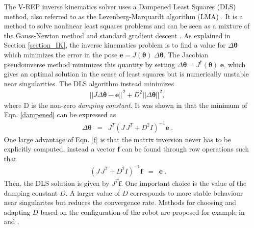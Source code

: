 The V-REP inverse kinematics solver uses a Dampened Least Squares (DLS) method, also referred to as the Levenberg-Marquardt algorithm (LMA) \cite{levenberg, marquardt}. It is a method to solve nonlinear least squares problems and can be seen as a mixture of the Gauss-Newton method and standard gradient descent \cite{bjorck}. As explained in  Section \ref{section_IK}, the inverse kinematics problem is to find a value for $\Delta\bm{\theta}$ which minimizes the error in the pose  $\bm{e}=J(\bm{\theta}) \; \Delta\bm{\theta}$. The Jacobian pseudoinverse method minimizes this quantity by setting $\Delta\bm{\theta}=J^{\dagger}(\bm{\theta}) \; \bm{e}$, which gives an optimal solution in the sense of least squares but is numerically unstable near singularities. The DLS algorithm instead minimizes 
\begin{eqnarray}\label{dampened}
	||J\Delta\bm{\theta}-\bm{e}||^2 + D^2||\Delta\bm{\theta}||^2,
\end{eqnarray} 
where D is the non-zero \textit{damping constant}.
It was shown in \cite{DLS_theta} that the minimum of Eqn. \ref{dampened} can be expressed as
\begin{eqnarray}\label{f}
	\Delta\bm{\theta} &=& J^T(J \, J^T+D^2I)^{-1}\bm{e}\;.
\end{eqnarray}
One large advantage of Eqn. \ref{f} is that the matrix inversion never has to be explicitly computed, instead a vector $\bm{f}$ can be found through row operations such that
\begin{eqnarray}\
	(J \, J^T+D^2I)^{-1}\bm{f} &=&\bm{e}\;. 
\end{eqnarray} 
Then, the DLS solution is given by $J^T\bm{f}$.
One important choice is the value of the damping constant $D$. A larger value of $D$ corresponds to more stable behaviour near singularites but reduces the convergence rate. Methods for choosing and adapting $D$ based on the configuration of the robot are proposed for example in \cite{D2} and \cite{D1}.